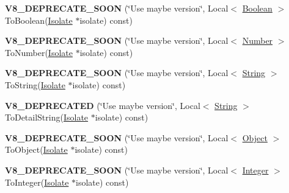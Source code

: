 \begin{DoxyCompactItemize}
\item 
{\bfseries V8\+\_\+\+D\+E\+P\+R\+E\+C\+A\+T\+E\+\_\+\+S\+O\+ON} (\char`\"{}Use maybe version\char`\"{}, Local$<$ \hyperlink{classv8_1_1_boolean}{Boolean} $>$ To\+Boolean(\hyperlink{classv8_1_1_isolate}{Isolate} $\ast$isolate) const)\hypertarget{classv8_1_1_value_ad3b9978f3fedccb48817ce87c5a454ed}{}\label{classv8_1_1_value_ad3b9978f3fedccb48817ce87c5a454ed}

\item 
{\bfseries V8\+\_\+\+D\+E\+P\+R\+E\+C\+A\+T\+E\+\_\+\+S\+O\+ON} (\char`\"{}Use maybe version\char`\"{}, Local$<$ \hyperlink{classv8_1_1_number}{Number} $>$ To\+Number(\hyperlink{classv8_1_1_isolate}{Isolate} $\ast$isolate) const)\hypertarget{classv8_1_1_value_a855a0b74584b9c322c04891783f37e9c}{}\label{classv8_1_1_value_a855a0b74584b9c322c04891783f37e9c}

\item 
{\bfseries V8\+\_\+\+D\+E\+P\+R\+E\+C\+A\+T\+E\+\_\+\+S\+O\+ON} (\char`\"{}Use maybe version\char`\"{}, Local$<$ \hyperlink{classv8_1_1_string}{String} $>$ To\+String(\hyperlink{classv8_1_1_isolate}{Isolate} $\ast$isolate) const)\hypertarget{classv8_1_1_value_a898f773c591e760fcb98e99cccff3e5c}{}\label{classv8_1_1_value_a898f773c591e760fcb98e99cccff3e5c}

\item 
{\bfseries V8\+\_\+\+D\+E\+P\+R\+E\+C\+A\+T\+ED} (\char`\"{}Use maybe version\char`\"{}, Local$<$ \hyperlink{classv8_1_1_string}{String} $>$ To\+Detail\+String(\hyperlink{classv8_1_1_isolate}{Isolate} $\ast$isolate) const)\hypertarget{classv8_1_1_value_a7afec72891a36d38aba6eb2ccf8b0a9d}{}\label{classv8_1_1_value_a7afec72891a36d38aba6eb2ccf8b0a9d}

\item 
{\bfseries V8\+\_\+\+D\+E\+P\+R\+E\+C\+A\+T\+E\+\_\+\+S\+O\+ON} (\char`\"{}Use maybe version\char`\"{}, Local$<$ \hyperlink{classv8_1_1_object}{Object} $>$ To\+Object(\hyperlink{classv8_1_1_isolate}{Isolate} $\ast$isolate) const)\hypertarget{classv8_1_1_value_a4c98939a72d6c48b01c8279cfe218d34}{}\label{classv8_1_1_value_a4c98939a72d6c48b01c8279cfe218d34}

\item 
{\bfseries V8\+\_\+\+D\+E\+P\+R\+E\+C\+A\+T\+E\+\_\+\+S\+O\+ON} (\char`\"{}Use maybe version\char`\"{}, Local$<$ \hyperlink{classv8_1_1_integer}{Integer} $>$ To\+Integer(\hyperlink{classv8_1_1_isolate}{Isolate} $\ast$isolate) const)\hypertarget{classv8_1_1_value_aae926c4392edf0ad4a5383ab0d8af4b1}{}\label{classv8_1_1_value_aae926c4392edf0ad4a5383ab0d8af4b1}


\end{DoxyCompactItemize}
